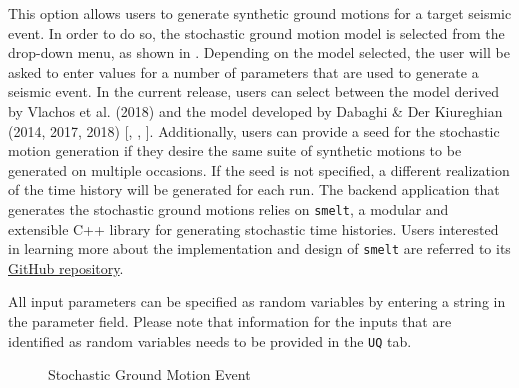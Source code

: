 This option allows users to generate synthetic ground motions for a
target seismic event. In order to do so, the stochastic ground motion
model is selected from the drop-down menu, as shown
in . Depending on the model selected, the
user will be asked to enter values for a number of parameters that are
used to generate a seismic event. In the current release, users can
select between the model derived by Vlachos et
al. (2018) \cite{vlachos2018predictive} and the model developed by
Dabaghi \& Der Kiureghian (2014, 2017, 2018)
[\cite{dabaghi2014stochastic}, \cite{dabaghi2017stochastic}, \cite{dabaghi2018simulation}]. Additionally,
users can provide a seed for the stochastic motion generation if they
desire the same suite of synthetic motions to be generated on multiple
occasions.  If the seed is not specified, a different realization of
the time history will be generated for each run. The backend
application that generates the stochastic ground motions relies
on \texttt{smelt}, a modular and extensible C++ library for generating
stochastic time histories. Users interested in learning more about the
implementation and design of
\texttt{smelt} are referred to its
\href{https://github.com/NHERI-SimCenter/smelt}{GitHub repository}.

All input parameters can be specified as random variables by entering
a string in the parameter field. Please note that information for the
inputs that are identified as random variables needs to be provided in
the \texttt{UQ} tab.

\begin{figure}[!htbp]
  \caption{Stochastic Ground Motion Event}
  \label{fig:stochastic_loading}
\end{figure}
